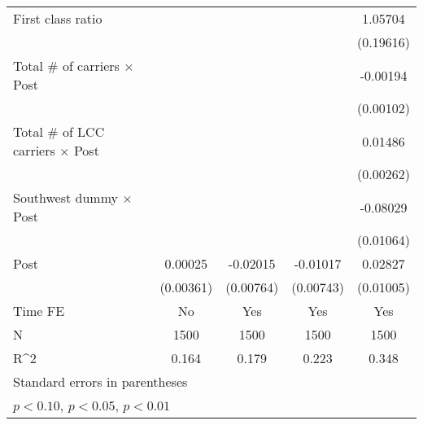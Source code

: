 \begin{table}[htbp]
\begin{tabular}{l*{4}{c}}
\addlinespace
First class ratio   &                     &                     &                     &     1.05704\sym{***}\\
                    &                     &                     &                     &   (0.19616)         \\
\addlinespace
Total # of carriers $\times$ Post&                     &                     &                     &    -0.00194\sym{*}  \\
                    &                     &                     &                     &   (0.00102)         \\
\addlinespace
Total # of LCC carriers $\times$ Post&                     &                     &                     &     0.01486\sym{***}\\
                    &                     &                     &                     &   (0.00262)         \\
\addlinespace
Southwest dummy $\times$ Post&                     &                     &                     &    -0.08029\sym{***}\\
                    &                     &                     &                     &   (0.01064)         \\
\addlinespace
Post                &     0.00025         &    -0.02015\sym{***}&    -0.01017         &     0.02827\sym{***}\\
                    &   (0.00361)         &   (0.00764)         &   (0.00743)         &   (0.01005)         \\
\midrule
Time FE             &          No         &         Yes         &         Yes         &         Yes         \\
N                   &        1500         &        1500         &        1500         &        1500         \\
R^2                 &       0.164         &       0.179         &       0.223         &       0.348         \\
\bottomrule
\multicolumn{5}{l}{\footnotesize Standard errors in parentheses}\\
\multicolumn{5}{l}{\footnotesize \sym{*} \(p<0.10\), \sym{**} \(p<0.05\), \sym{***} \(p<0.01\)}\\
\end{tabular}
\end{table}
